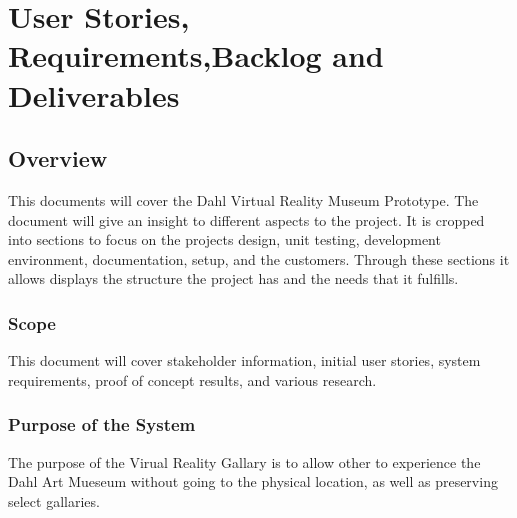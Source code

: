 \chapter{User Stories,  Requirements,Backlog and Deliverables}
\section{Overview}


This documents  will cover the Dahl Virtual Reality Museum Prototype. The document will give an insight to different aspects to the project. It is cropped into sections to focus on the projects design, unit testing, development environment, documentation, setup, and the customers. Through these sections it allows displays the structure the project has and the needs that it fulfills.






\subsection{Scope}


This document will cover stakeholder information, 
initial user stories, system requirements, proof of concept results, 
and various research. 



\subsection{Purpose of the System}
The purpose of the Virual Reality Gallary is to allow other to experience the Dahl Art
Mueseum without going to the physical location, as well as preserving select gallaries.  



